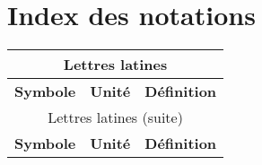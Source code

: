 \chapter{Index des notations}\label{chap:IndexNotations}%

\begin{center}
    \begin{longtable}{p{} @{} p{} @{} p{}}
        \multicolumn{3}{c}{Lettres latines}  \\\hline
        \textbf{Symbole} & \textbf{Unité} & \textbf{Définition} \\\hline\hline \endfirsthead
        \multicolumn{3}{c}{Lettres latines (suite)}  \\\hline
        \textbf{Symbole} & \textbf{Unité} & \textbf{Définition} \\\hline\hline \endhead
		

\end{longtable}
\end{center}
